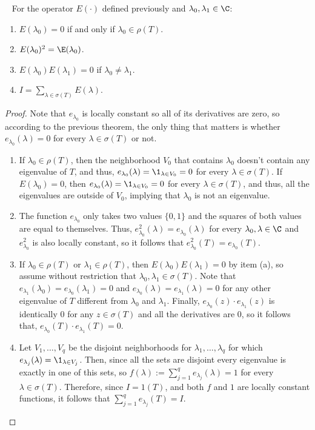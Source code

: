 \begin{theorem}~\label{ch2t4} For the operator $E(\cdot)$ defined previously and $\lambda_0,\lambda_1 \in \C$:
    \begin{enumerate}[label = (\alph*)]
        \item $E(\lambda_0) = 0$ if and only if $\lambda_0 \in \rho(T)$.
        \item $E(\lambda_0)^2 = \E(\lambda_0) $.
        \item $E(\lambda_0)E(\lambda_1) = 0$ if $\lambda_0 \neq \lambda_1$.
        \item $I = \sum_{\lambda \in \sigma(T)} E(\lambda)$.
    \end{enumerate}
\end{theorem}

\begin{proof}Note that $e_{\lambda_0}$ is locally constant so all of its derivatives are zero, so according to the previous theorem, the only thing that matters is whether $e_{\lambda_0}(\lambda) = 0$ for every $\lambda \in \sigma(T)$ or not.
    \begin{enumerate}[label = (\alph*)]
        \item  If $\lambda_0 \in \rho(T)$, then the neighborhood $V_0$ that contains $\lambda_0$ doesn't contain any eigenvalue of $T$, and thus, $e_{\lambda_0}(\lambda) = \1_{\lambda \in V_0} = 0$ for every $\lambda \in \sigma(T)$. If $E(\lambda_0) = 0$, then $e_{\lambda_0}(\lambda) = \1_{\lambda \in V_0} = 0$ for every $\lambda \in \sigma(T)$, and thus, all the eigenvalues are outside of $V_0$, implying that $\lambda_0$ is not an eigenvalue.
        \item The function $e_{\lambda_0}$ only takes two values $\{0,1\}$ and the squares of both values are equal to themselves. Thus, $e_{\lambda_0}^2(\lambda) = e_{\lambda_0}(\lambda)$ for every $\lambda_0, \lambda \in \C$ and $e_{\lambda_0}^2$ is also locally constant, so it follows that $e_{\lambda_0}^2(T) = e_{\lambda_0}(T)$.
        \item If $\lambda_0 \in \rho(T)$ or $\lambda_1 \in \rho(T)$, then $E(\lambda_0)E(\lambda_1) = 0$ by item (a), so assume without restriction that $\lambda_0,\lambda_1 \in \sigma(T)$. Note that $e_{\lambda_1}(\lambda_0) = e_{\lambda_0}(\lambda_1) = 0$ and $e_{\lambda_0}(\lambda) = e_{\lambda_1}(\lambda) = 0$ for any other eigenvalue of $T$ different from $\lambda_0$ and $\lambda_1$. Finally, $e_{\lambda_0}(z)\cdot e_{\lambda_1}(z)$ is identically 0 for any $z \in \sigma(T)$ and all the derivatives are 0, so it follows that, $e_{\lambda_0}(T)\cdot e_{\lambda_1}(T) = 0$.
        \item Let $V_1,\ldots, V_q$ be the disjoint neighborhoods for $\lambda_1, \ldots, \lambda_q$ for which $e_{\lambda_j}(\lambda) = \1_{\lambda \in V_j}$. Then, since all the sets are disjoint every eigenvalue is exactly in one of this sets, so $f(\lambda) := \sum_{j = 1}^{q}e_{\lambda_j}(\lambda) = 1$ for every $\lambda \in \sigma(T)$. Therefore, since $I = 1(T)$, and both $f$ and $1$ are locally constant functions, it follows that $\sum_{j = 1}^{q}e_{\lambda_j}(T) = I$.
    \end{enumerate}
\end{proof}

